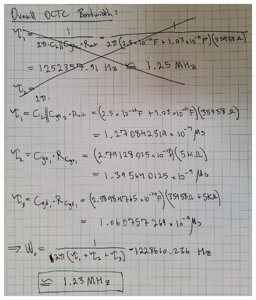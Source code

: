 \documentclass[12pt, fleqn]{article}
\begin{document}
\newpage
\includegraphics[scale=0.165, angle=90, center]{p1_6.jpg}\\
\newpage
\end{document}
